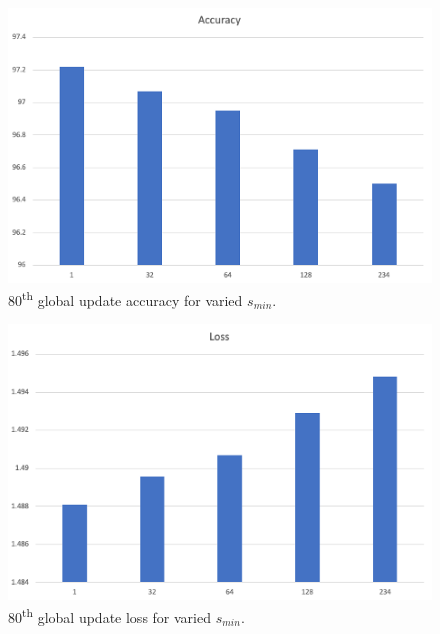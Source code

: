 \documentclass[../mthe-493-final-project.tex]{subfiles}
\begin{document}
    \begin{figure}
        \centering
        \includegraphics[width=120mm]{thesis/img/res_19.png}
        \caption{80\textsuperscript{th} global update accuracy for varied $s_{min}$.}
        \label{fig:res_19}
    \end{figure}
    \begin{figure}
        \centering
        \includegraphics[width=120mm]{thesis/img/res_20.png}
        \caption{80\textsuperscript{th} global update loss for varied $s_{min}$.}
        \label{fig:res_20}
    \end{figure}
\end{document}
